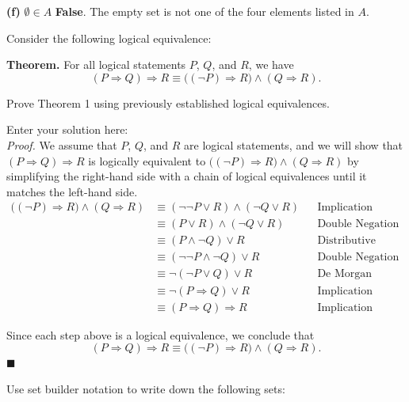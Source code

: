 \documentclass[10pt]{exam}
\begin{document}
\begin{questions}
\begin{solution}
\textbf{(f)} $\emptyset \in A$ \quad \textbf{False}. The empty set is not one of the four elements listed in $A$.
\end{solution}

\question Consider the following logical equivalence:

\begin{center}
\textbf{Theorem.} For all logical statements $P$, $Q$, and $R$, we have
\[(P \Rightarrow Q) \Rightarrow R \equiv \bigl((\lnot P) \Rightarrow R\bigr) \land (Q \Rightarrow R).\]
\end{center}

Prove Theorem 1 using previously established logical equivalences.

\begin{solution}
Enter your solution here:\\
\textit{Proof.} We assume that $P$, $Q$, and $R$ are logical statements, and we will show that $(P \Rightarrow Q) \Rightarrow R$ is logically equivalent to $\bigl((\lnot P) \Rightarrow R\bigr) \land (Q \Rightarrow R)$ by simplifying the right-hand side with a chain of logical equivalences until it matches the left-hand side.
\begin{align*}
\bigl((\lnot P) \Rightarrow R\bigr) \land (Q \Rightarrow R)
&\equiv (\lnot \lnot P \lor R) \land (\lnot Q \lor R)
&& \text{Implication (applied twice)} \\
&\equiv (P \lor R) \land (\lnot Q \lor R)
&& \text{Double Negation} \\[2pt]
&\equiv (P \land \lnot Q) \lor R
&& \text{Distributive} \\[2pt]
&\equiv (\lnot \lnot P \land \lnot Q) \lor R
&& \text{Double Negation} \\[2pt]
&\equiv \lnot (\lnot P \lor Q) \lor R
&& \text{De Morgan} \\[2pt]
&\equiv \lnot (P \Rightarrow Q) \lor R
&& \text{Implication} \\[2pt]
&\equiv (P \Rightarrow Q) \Rightarrow R
&& \text{Implication}
\end{align*}

Since each step above is a logical equivalence, we conclude that
\[(P \Rightarrow Q) \Rightarrow R \equiv \bigl((\lnot P) \Rightarrow R\bigr) \land (Q \Rightarrow R).\]
$\blacksquare$
\end{solution}

\question Use set builder notation to write down the following sets:

\end{questions}
\end{document}
